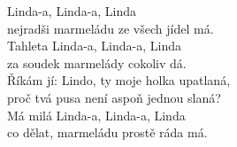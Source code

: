  

\nv{}Linda-a, Linda-a, Linda\\
nejradši marmeládu ze všech jídel má. \\
Tahleta Linda-a, Linda-a, Linda\\
za soudek marmelády cokoliv dá.\\
Říkám jí: Lindo, ty moje holka upatlaná,\\
proč tvá pusa není aspoň jednou slaná?\\
Má milá Linda-a, Linda-a, Linda\\
co dělat, marmeládu prostě ráda má. 
